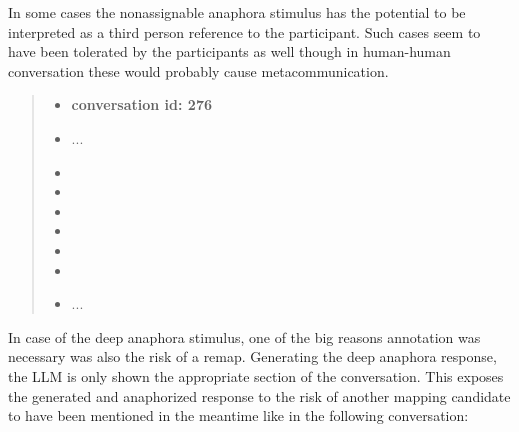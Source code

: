 In some cases the nonassignable anaphora stimulus has the potential
to be interpreted as a third person reference to the participant.
Such cases seem to have been tolerated by the participants as well
though in human-human conversation these would probably cause metacommunication.

    \begin{quote}
    \begin{itemize}[label={}, leftmargin=0pt, itemsep=0.5em]
    \item \textbf{conversation id: 276}
    \item ...
    \item {}
    \item {}
    \item {}
    \item {}
    \item {}
    \item {}
    \item ...
    \end{itemize}
    \end{quote}

In case of the deep anaphora stimulus, one of the big reasons annotation was necessary
was also the risk of a remap.
Generating the deep anaphora response, the LLM is only shown the appropriate section of the conversation.
This exposes the generated and anaphorized response
to the risk of another mapping candidate to have been mentioned in the meantime like in the following conversation:

